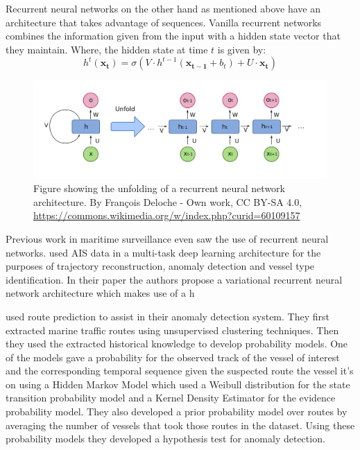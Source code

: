 \documentclass[bsc,frontabs,twoside,singlespacing,parskip,deptreport]{infthesis}     %
\begin{document}
Recurrent neural networks on the other hand as mentioned above have an architecture that takes advantage of sequences. Vanilla recurrent networks combines the information given from the input with a hidden state vector that they maintain. Where, the hidden state at time $t$ is given by:
$$h^t(\mathbf{x_t}) = \sigma( V \cdot h^{t-1}(\mathbf{x_{t-1}} + b_t) + U \cdot \mathbf{x_t})$$

\begin{figure}
    \centering
    \includegraphics[width=\linewidth]{report/images/Recurrent_neural_network_unfold.png}
    \caption{Figure showing the unfolding of a recurrent neural network architecture. By François Deloche - Own work, CC BY-SA 4.0, \url{https://commons.wikimedia.org/w/index.php?curid=60109157}}
    \label{fig:my_label}
\end{figure}

Previous work in maritime surveillance even saw the use of recurrent neural networks. \citep{nguyen2018multi} used AIS data in a multi-task deep learning architecture for the purposes of trajectory reconstruction, anomaly detection and vessel type identification. In their paper the authors propose a variational recurrent neural network architecture which makes use of a h



\cite{pallotta2013vessel} used route prediction to assist in their anomaly detection system. They first extracted marine traffic routes using unsupervised clustering techniques. Then they used the extracted historical knowledge to develop probability models. One of the models gave a probability for the observed track of the vessel of interest and the corresponding temporal sequence given the suspected route the vessel it's on using a Hidden Markov Model which used a Weibull distribution for the state transition probability model and a Kernel Density Estimator for the evidence probability model. They also developed a prior probability model over routes by averaging the number of vessels that took those routes in the dataset. Using these probability models they developed a hypothesis test for anomaly detection.
\end{document}
